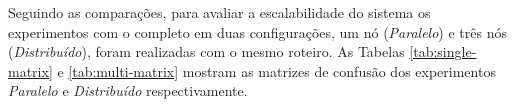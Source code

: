 




\newcommand{\single}{\textit{Paralelo}\xspace}
\newcommand{\multi}{\textit{Distribuído}\xspace}

Seguindo as comparações, para avaliar a escalabilidade do sistema os
experimentos com o \mfog completo em duas configurações, um nó (\single) e três
nós (\multi), foram realizadas com o mesmo roteiro.
As Tabelas \ref{tab:single-matrix} e \ref{tab:multi-matrix} mostram as matrizes
de confusão dos experimentos \single e \multi respectivamente.

